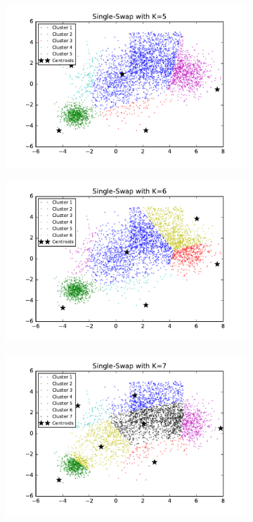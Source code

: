 \begin{figure}[htb]
\begin{subfigure}[b]{0.475\textwidth}
            \includegraphics[width=\textwidth]{./figures/bigClustering_singleSwap_5.pdf}
        \end{subfigure}
        \hfill
        \begin{subfigure}[b]{0.475\textwidth}   
            \centering 
            \includegraphics[width=\textwidth]{./figures/bigClustering_singleSwap_6.pdf}
        \end{subfigure}
        \begin{subfigure}[b]{0.475\textwidth}   
            \centering 
            \includegraphics[width=\textwidth]{./figures/bigClustering_singleSwap_7.pdf}

\end{subfigure}
\end{figure}
